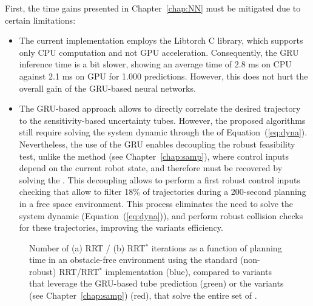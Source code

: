 First, the time gains presented in Chapter~\ref{chap:NN} must be mitigated due to certain limitations:
\begin{itemize}
    \item The current implementation employs the Libtorch C library, which supports only CPU computation and not GPU acceleration.
    Consequently, the GRU inference time is a bit slower, showing an average time of 2.8 ms on CPU against 2.1 ms on GPU for 1.000 predictions.
    However, this does not hurt the overall gain of the GRU-based neural networks.
    \item The GRU-based approach allows to directly correlate the desired trajectory to the sensitivity-based uncertainty tubes.
    However, the proposed  algorithms still require solving the system dynamic through the  of Equation~(\ref{eq:dyna}).
    Nevertheless, the use of the GRU enables decoupling the robust feasibility test, unlike the  method (see Chapter~\ref{chap:samp}), where control inputs depend on the current robot state, and therefore must be recovered by solving the .
    This decoupling allows to perform a first robust control inputs checking that allow to filter 18\% of trajectories during a 200-second planning in a free space environment.
    This process eliminates the need to solve the system dynamic  (Equation~(\ref{eq:dyna})), and perform robust collision checks for these trajectories, improving the  variants efficiency.
\end{itemize}

\begin{figure} [htp]
    \centering
    \caption{Number of (a) RRT / (b) RRT$^*$ iterations as a function of planning time in an obstacle-free environment using the standard (non-robust) RRT/RRT$^*$ implementation (blue), compared to  variants that leverage the GRU-based tube prediction (green) or the  variants (see Chapter~\ref{chap:samp}) (red), that solve the entire set of .}%
    \label{fig: NNTime}%
\end{figure}

